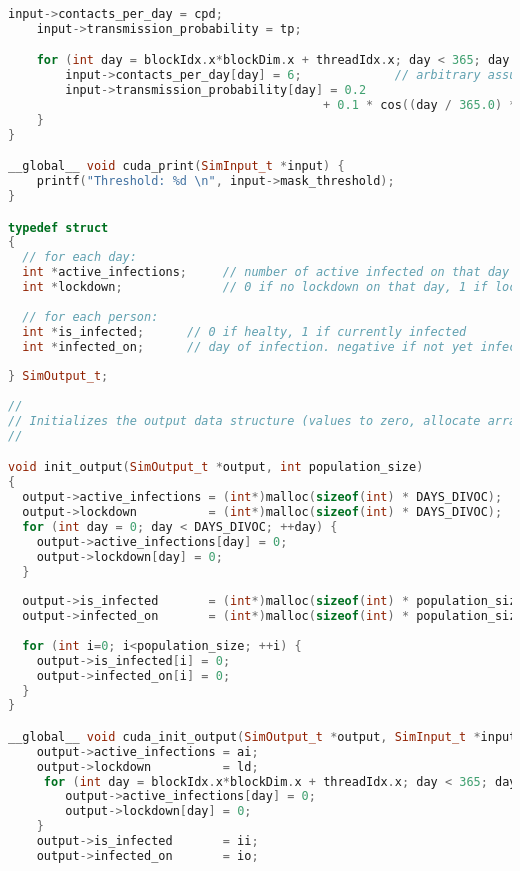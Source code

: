 \begin{lstlisting}[language=C++, title=C++ code for ]
    input->contacts_per_day = cpd;
    input->transmission_probability = tp;

    for (int day = blockIdx.x*blockDim.x + threadIdx.x; day < 365; day += gridDim.x*blockDim.x) {
        input->contacts_per_day[day] = 6;             // arbitrary assumption of six possible transmission contacts per person per day, all year
        input->transmission_probability[day] = 0.2
                                            + 0.1 * cos((day / 365.0) * 2 * M_PI);   // higher transmission in winter, lower transmission during summer
    }
}

__global__ void cuda_print(SimInput_t *input) {
    printf("Threshold: %d \n", input->mask_threshold);
}

typedef struct
{
  // for each day:
  int *active_infections;     // number of active infected on that day (including incubation period)
  int *lockdown;              // 0 if no lockdown on that day, 1 if lockdown
 
  // for each person:
  int *is_infected;      // 0 if healty, 1 if currently infected
  int *infected_on;      // day of infection. negative if not yet infected. January 1 is Day 0.
 
} SimOutput_t;
 
//
// Initializes the output data structure (values to zero, allocate arrays)
//

void init_output(SimOutput_t *output, int population_size)
{
  output->active_infections = (int*)malloc(sizeof(int) * DAYS_DIVOC);
  output->lockdown          = (int*)malloc(sizeof(int) * DAYS_DIVOC);
  for (int day = 0; day < DAYS_DIVOC; ++day) {
    output->active_infections[day] = 0;
    output->lockdown[day] = 0;
  }
 
  output->is_infected       = (int*)malloc(sizeof(int) * population_size);
  output->infected_on       = (int*)malloc(sizeof(int) * population_size);
 
  for (int i=0; i<population_size; ++i) {
    output->is_infected[i] = 0;
    output->infected_on[i] = 0;
  }
}

__global__ void cuda_init_output(SimOutput_t *output, SimInput_t *input, int *ai, int *ld, int *ii, int *io) {
    output->active_infections = ai;
    output->lockdown          = ld;
     for (int day = blockIdx.x*blockDim.x + threadIdx.x; day < 365; day += gridDim.x*blockDim.x) {
        output->active_infections[day] = 0;
        output->lockdown[day] = 0;
    }
    output->is_infected       = ii;
    output->infected_on       = io;
    

\end{lstlisting}
